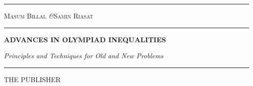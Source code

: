 \documentclass[a4paper, 12pt, leqno]{extbook}
\theoremstyle{definition}
\numberwithin{problem}{chapter}
\begin{document}
	\frontmatter
	\begin{titlepage}
		\txtheight
		\begin{minipage}[t]{0.05\txtwidth}
			\color{rosewood}
			\rule{6pt}{\txtheight}
		\end{minipage}
		\hspace{0.05\txtwidth}
		\begin{minipage}[t]{2\txtwidth}
			\color{smokyblack}
			\vspace*{\drop}
			{\Large {\scshape Masum Billal} \quad\textit{\&}\quad \textsc{Samin Riasat}} \\
			\rule{1\txtwidth}{1pt} \par
			\vspace{3\baselineskip}
			{\noindent\bfseries ADVANCES IN OLYMPIAD INEQUALITIES} \par
			\vspace{2\baselineskip}
			{\large\itshape Principles and Techniques for Old and New Problems} \par
			\vspace{6.5\baselineskip}
			{\scshape } \par
			\vspace{0.1\baselineskip}
			{\Large } \par
			\vspace{\baselineskip}
			\rule{\txtwidth}{1pt} \par
			\vspace{\baselineskip}
			{\Large THE PUBLISHER}
		\end{minipage}
		\hfill
	\end{titlepage}
\end{document}
